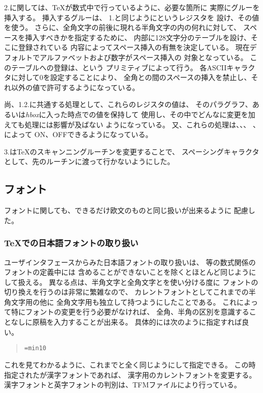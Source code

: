 2.に関しては、\TeX が数式中で行っているように、必要な箇所に
実際にグルーを挿入する。 挿入するグルーは、
1.と同じように{\bf{}}というレジスタを
設け、その値を使う。
さらに、全角文字の前後に現れる半角文字の内の何れに対して、
スペースを挿入すべきかを指定するために、
内部に128文字分のテーブルを設け、そこに登録されている
内容によってスペース挿入の有無を決定している。
現在デフォルトでアルファベットおよび数字がスペース挿入の
対象となっている。 このテーブルへの登録は、{\bf{}}という
プリミティブによって行う。
各ASCIIキャラクタに対して0を設定することにより、
全角との間のスペースの挿入を禁止し、それ以外の値で許可するようになっている。

尚、1.2.に共通する処理として、これらのレジスタの値は、
そのパラグラフ、あるいは{\it hbox}に入った時点での値を保持して
使用し、その中でどんなに変更を加えても処理には影響が及ばない
ようになっている。
又、これらの処理は、{\bf{}}、{\bf{}}、
{\bf{}}、{\bf{}}によって
ON、OFFできるようになっている。

3.は\TeX のスキャンニングルーチンを変更することで、
スペーシングキャラクタとして、先のルーチンに渡って行かないようにした。
%
\subsection{フォント}
フォントに関しても、できるだけ欧文のものと同じ扱いが出来るように
配慮した。
\subsubsection{\TeX での日本語フォントの取り扱い}
ユーザインタフェースからみた日本語フォントの取り扱いは、
{\it{}}等の数式関係のフォントの定義中には
含めることができないことを除くとほとんど同じようにして扱える。
異なる点は、半角文字と全角文字とを使い分ける度に
フォントの切り換えを行うのは非常に繁雑なので、
カレントフォントとしてこれまでの半角文字用の他に
全角文字用も独立して持つようにしたことである。
これによって特にフォントの変更を行う必要がなければ、
全角、半角の区別を意識することなしに原稿を入力することが出来る。
具体的には次のように指定すれば良い。
\begin{quote}
\tt {}=min10\\
\end{quote}
これを見てわかるように、これまでと全く同じようにして指定できる。
この時指定されたが漢字フォントであれば、
漢字用のカレントフォントを変更する。
漢字フォントと英字フォントの判別は、TFMファイルにより行っている。

